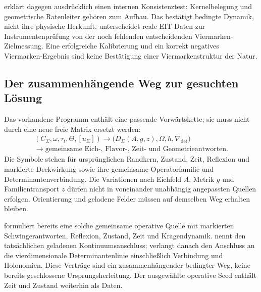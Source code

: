  erklärt dagegen ausdrücklich einen internen Konsistenztest: Kernelbelegung und geometrische Ratenleiter gehören zum Aufbau. Das bestätigt bedingte Dynamik, nicht ihre physische Herkunft.  unterscheidet reale EIT-Daten zur Instrumentenprüfung von der noch fehlenden entscheidenden Viermarken-Zielmessung. Eine erfolgreiche Kalibrierung und ein korrekt negatives Viermarken-Ergebnis sind keine Bestätigung einer Viermarkenstruktur der Natur.

\subsection*{Der zusammenhängende Weg zur gesuchten Lösung}
Das vorhandene Programm enthält eine passende Vorwärtskette; sie muss nicht durch eine neue freie Matrix ersetzt werden:
\[
\begin{gathered}
 (C_\Sigma,\omega,\tau_t,\Theta,[u_\Sigma])
 \longrightarrow
 \bigl(D_\Sigma(A,g,z),\Omega,h,\nabla_{\det}\bigr)\\
 \longrightarrow
 \text{gemeinsame Eich-, Flavor-, Zeit- und Geometrieantworten}.
\end{gathered}
\]
Die Symbole stehen für ursprünglichen Randkern, Zustand, Zeit, Reflexion und markierte Deckwirkung sowie ihre gemeinsame Operatorfamilie und Determinantenverbindung. Die Variationen nach Eichfeld $A$, Metrik $g$ und Familientransport $z$ dürfen nicht in voneinander unabhängig angepassten Quellen erfolgen. Orientierung und geladene Felder müssen auf demselben Weg erhalten bleiben.

 formuliert bereits eine solche gemeinsame operative Quelle mit markierten Schwingerantworten, Reflexion, Zustand, Zeit und Kragendynamik.  nennt den tatsächlichen geladenen Kontinuumsanschluss;  verlangt danach den Anschluss an die vierdimensionale Determinantenlinie einschließlich Verbindung und Holonomien. Diese Verträge sind ein zusammenhängender bedingter Weg, keine bereits geschlossene Ursprungsherleitung. Der ausgewählte operative Seed enthält Zeit und Zustand weiterhin als Daten.



